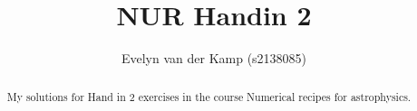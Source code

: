 \documentclass[a4paper,10pt]{article}
\title{NUR Handin 2}
\author{Evelyn van der Kamp (s2138085)}
\begin{document}
\maketitle

\begin{abstract}
 My solutions for Hand in 2 exercises in the 
 course Numerical recipes for astrophysics.
\end{abstract}




\end{document}
